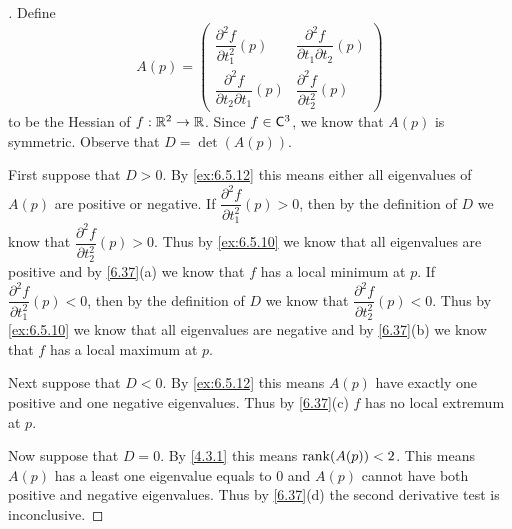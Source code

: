 \begin{proof}[]
  Define
  \[
    A(p) = \begin{pmatrix}
      \dfrac{\partial^2 f}{\partial t_1^2}(p)            & \dfrac{\partial^2 f}{\partial t_1 \partial t_2}(p) \\
      \dfrac{\partial^2 f}{\partial t_2 \partial t_1}(p) & \dfrac{\partial^2 f}{\partial t_2^2}(p)
    \end{pmatrix}
  \]
  to be the Hessian of \(f : \mathbb{R}^2 \to \mathbb{R}\).
  Since \(f \in \cfs[3]\), we know that \(A(p)\) is symmetric.
  Observe that \(D = \det(A(p))\).

  First suppose that \(D > 0\).
  By \cref{ex:6.5.12} this means either all eigenvalues of \(A(p)\) are positive or negative.
  If \(\dfrac{\partial^2 f}{\partial t_1^2}(p) > 0\), then by the definition of \(D\) we know that \(\dfrac{\partial^2 f}{\partial t_2^2}(p) > 0\).
  Thus by \cref{ex:6.5.10} we know that all eigenvalues are positive and by \cref{6.37}(a) we know that \(f\) has a local minimum at \(p\).
  If \(\dfrac{\partial^2 f}{\partial t_1^2}(p) < 0\), then by the definition of \(D\) we know that \(\dfrac{\partial^2 f}{\partial t_2^2}(p) < 0\).
  Thus by \cref{ex:6.5.10} we know that all eigenvalues are negative and by \cref{6.37}(b) we know that \(f\) has a local maximum at \(p\).

  Next suppose that \(D < 0\).
  By \cref{ex:6.5.12} this means \(A(p)\) have exactly one positive and one negative eigenvalues.
  Thus by \cref{6.37}(c) \(f\) has no local extremum at \(p\).

  Now suppose that \(D = 0\).
  By \cref{4.3.1} this means \(\rk{A(p)} < 2\).
  This means \(A(p)\) has a least one eigenvalue equals to \(0\) and \(A(p)\) cannot have both positive and negative eigenvalues.
  Thus by \cref{6.37}(d) the second derivative test is inconclusive.
\end{proof}

\begin{ex}\label{ex:6.8.21}
\end{ex}

\begin{ex}\label{ex:6.8.23}
\end{ex}
